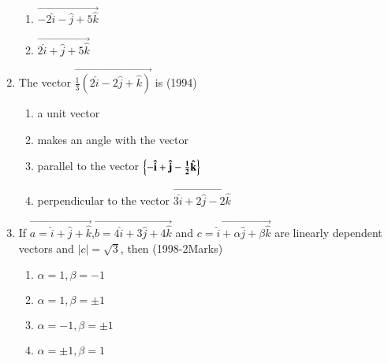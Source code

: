 \documentclass[journal,12pt,twocolumn]{IEEEtran}
\theoremstyle{remark}
\begin{document}
\begin{enumerate}
\begin{enumerate}
			\item $\vec{-2\hat{i}-\hat{j}+5\hat{k}}$
			\item $\vec{2\hat{i}+\hat{j}+5\hat{k}}$
		\end{enumerate}
\item %
	The vector $\vec{\frac{1}{3}(2\hat{i}-2\hat{j}+\hat{k})}$ is \hfill{(1994)}\\
		\begin{enumerate}
			\item a unit vector
			\item makes an angle with the vector
			\item parallel to the vector $\mathbf{\left\{-\hat{i}+\hat{j}-\frac{1}{2}\hat{k}\right\}}$
			\item perpendicular to the vector $\vec{3\hat{i}+2\hat{j}-2\hat{k}}$
                \end{enumerate}
\item %
	If $\vec{a=\hat{i}+\hat{j}+\hat{k}}$,$\vec{b=4\hat{i}+3\hat{j}+4\hat{k}}$ and $\vec{c=\hat{i}+\alpha\hat{j}+\beta\hat{k}}$ are linearly dependent vectors and $|c|=\sqrt{3}$, then \hfill{(1998-2Marks)}\\
		\begin{enumerate}
			\item $\alpha=1,\beta=-1$
			\item $\alpha=1,\beta=\pm1$
			\item $\alpha=-1,\beta=\pm1$
			\item $\alpha=\pm1,\beta=1$
		\end{enumerate}
\end{enumerate}
\end{document}
